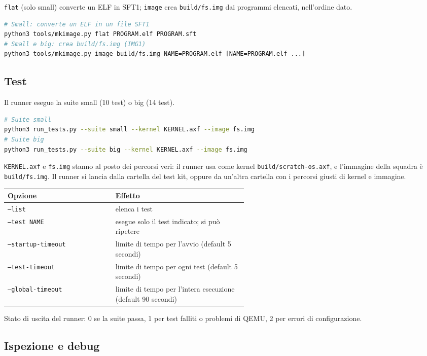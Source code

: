 \texttt{flat} (solo small) converte un ELF in SFT1; \texttt{image} crea \texttt{build/fs.img} dai programmi elencati, nell'ordine dato.
\begin{lstlisting}[language=bash]
# Small: converte un ELF in un file SFT1
python3 tools/mkimage.py flat PROGRAM.elf PROGRAM.sft
# Small e big: crea build/fs.img (IMG1)
python3 tools/mkimage.py image build/fs.img NAME=PROGRAM.elf [NAME=PROGRAM.elf ...]
\end{lstlisting}

\subsection{Test}

Il runner esegue la suite small (10 test) o big (14 test).
\begin{lstlisting}[language=bash]
# Suite small
python3 run_tests.py --suite small --kernel KERNEL.axf --image fs.img
# Suite big
python3 run_tests.py --suite big --kernel KERNEL.axf --image fs.img
\end{lstlisting}
\texttt{KERNEL.axf} e \texttt{fs.img} stanno al posto dei percorsi veri: il runner usa come kernel \texttt{build/scratch-os.axf}, e l'immagine della squadra è \texttt{build/fs.img}. Il runner si lancia dalla cartella del test kit, oppure da un'altra cartella con i percorsi giusti di kernel e immagine.

\begin{center}
\small
\begin{tabular}{|l|p{0.55\linewidth}|}
\hline
Opzione & \raggedright Effetto \tabularnewline
\hline\hline
\texttt{--list} & \raggedright elenca i test \tabularnewline
\hline
\texttt{--test NAME} & \raggedright esegue solo il test indicato; si può ripetere \tabularnewline
\hline
\texttt{--startup-timeout} & \raggedright limite di tempo per l'avvio (default 5 secondi) \tabularnewline
\hline
\texttt{--test-timeout} & \raggedright limite di tempo per ogni test (default 5 secondi) \tabularnewline
\hline
\texttt{--global-timeout} & \raggedright limite di tempo per l'intera esecuzione (default 90 secondi) \tabularnewline
\hline
\end{tabular}
\end{center}

Stato di uscita del runner: 0 se la suite passa, 1 per test falliti o problemi di QEMU, 2 per errori di configurazione.

\subsection{Ispezione e debug}


